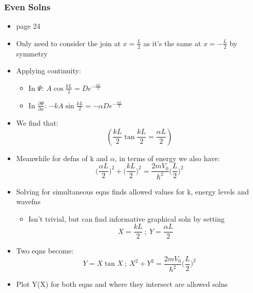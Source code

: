 \documentclass[a4paper,11pt,normalem]{article}
\begin{document}
\subsubsection{Even Solns}
\begin{itemize}
\item
  page 24
\item
  Only need to consider the join at \(x = \frac{L}{2}\) as it's the same
  at \(x = -\frac{L}{2}\) by symmetry
\item
  Applying continuity:
  \begin{itemize}
  \item
    In \(\Psi\): \(A\cos{\frac{kL}{2}} = De^{-\frac{\alpha L}{2}}\)
  \item
    In \(\frac{\partial \Psi}{\partial x}\):
    \(-kA\sin{\frac{kL}{2}} = -\alpha De^{-\frac{\alpha L}{2}}\)
  \end{itemize}
\item
  We find that: \[
  (\frac{kL}{2}\tan{\frac{kL}{2}} = \frac{\alpha L}{2})
  \]
\item
  Meanwhile for defns of k and \(\alpha\), in terms of energy we also
  have: \[
  \Big(\frac{\alpha L}{2}\Big)^2 + \Big(\frac{kL}{2} \Big)^2 = \frac{2mV_0}{\hbar^2}\Big(\frac{L}{2} \Big)^2
  \]
\item
  Solving for simultaneous eqns finds allowed values for k, energy
  levels and wavefns
  \begin{itemize}
  \item
    Isn't trivial, but can find informative graphical soln by setting \[
    X = \frac{kL}{2} ~;~ Y = \frac{\alpha L}{2}
    \]
  \end{itemize}
\item
  Two eqns become: \[
  Y = X\tan X ~;~ X^2 + Y^2 = \frac{2mV_0}{\hbar^2}\Big(\frac{L}{2} \Big)^2
  \]
\item
  Plot Y(X) for both eqns and where they intersect are allowed solns
\end{itemize}
\end{document}
